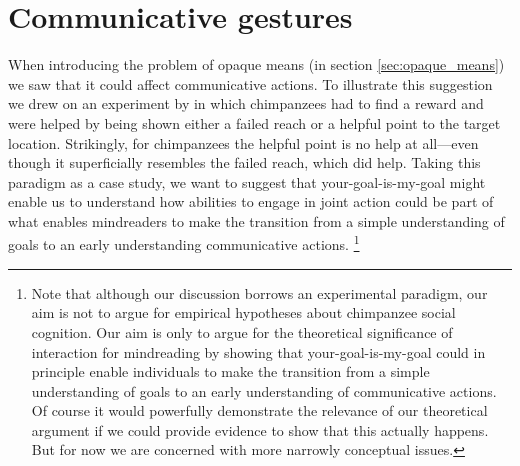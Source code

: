 \documentclass[12pt,a4paper]{extarticle}
\begin{document}
\section{Communicative gestures}
\label{sec:communicative_gestures}
When introducing the problem of opaque means 
(in section \vref{sec:opaque_means})
we saw that it could  affect
communicative actions.
To illustrate this suggestion we drew on 
an experiment by \citet{hare_chimpanzees_2004}
in which chimpanzees had to find a reward 
and were helped by being shown either a failed reach or  a helpful point to the target location.
Strikingly, for chimpanzees the helpful point is no help at all---even though it superficially resembles the failed reach, which  did help.
Taking this paradigm as a case study, 
we want to suggest that your-goal-is-my-goal might 
enable us to understand how abilities to engage in joint action 
could be part of what enables mindreaders to make the transition from 
a simple understanding of goals 
to 
an early understanding communicative actions.%
\footnote{
Note that although our discussion borrows an experimental paradigm,
our aim is not to argue for empirical hypotheses about chimpanzee social cognition.
Our aim is only to argue for the theoretical significance of interaction for mindreading by showing 
that your-goal-is-my-goal
could {in principle} enable
individuals to make the transition 
from
 a simple understanding of goals
to
 an early understanding of communicative actions.
Of course it would powerfully demonstrate the relevance of our theoretical argument if we could provide evidence to show that this actually happens.
But for now we are concerned with more narrowly conceptual issues.
}
\end{document}
